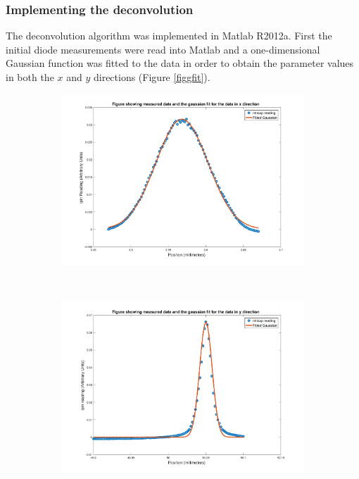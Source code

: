 \subsubsection{Implementing the deconvolution}
\label{subs:Implementing the deconvolution}
The deconvolution algorithm was implemented in Matlab R2012a.
First the initial diode measurements were read into Matlab and a one-dimensional Gaussian function was fitted to the data in order to obtain the parameter values in both the $x$ and $y$ directions (Figure \ref{figgfit}).
\begin{figure}
        \centering
        \begin{subfigure}[b]{0.9\textwidth}
                \centering
                \includegraphics[width=\textwidth]{figures/beam/ApertureScans_x.pdf}
                \caption{}
                \label{figfitx}
        \end{subfigure}
				\\
        \begin{subfigure}[b]{0.9\textwidth}
                \centering
                \includegraphics[width=\textwidth]{figures/beam/ApertureScans_y.pdf}

\end{subfigure}
\end{figure}
